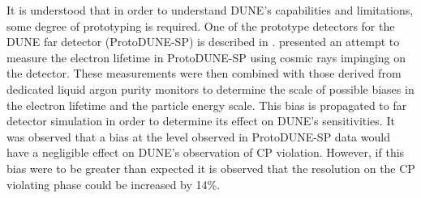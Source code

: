 It is understood that in order to understand DUNE's capabilities and limitations, some degree of prototyping is required.
One of the prototype detectors for the DUNE far detector (ProtoDUNE-SP) is described in .
 presented an attempt to measure the electron lifetime in ProtoDUNE-SP using cosmic rays impinging on the detector.
These measurements were then combined with those derived from dedicated liquid argon purity monitors to determine the scale of possible biases in the electron lifetime and the particle energy scale.
This bias is propagated to far detector simulation in order to determine its effect on DUNE's sensitivities.
It was observed that a bias at the level observed in ProtoDUNE-SP data would have a negligible effect on DUNE's observation of CP violation.
However, if this bias were to be greater than expected it is observed that the resolution on the CP violating phase could be increased by 14\%.



